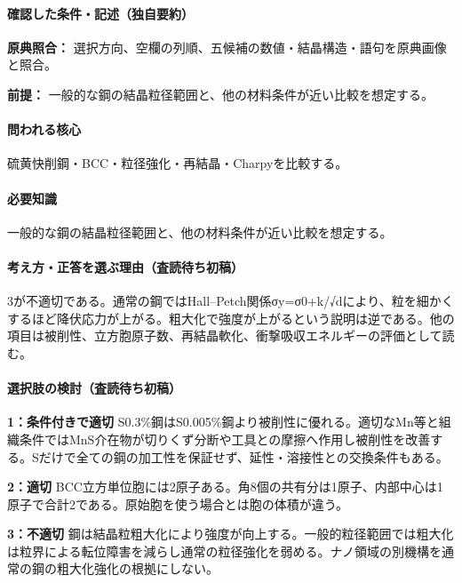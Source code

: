 \paragraph{確認した条件・記述（独自要約）}\mbox{}\par

\noindent\textbf{原典照合：} 選択方向、空欄の列順、五候補の数値・結晶構造・語句を原典画像と照合。\par

\noindent\textbf{前提：} 一般的な鋼の結晶粒径範囲と、他の材料条件が近い比較を想定する。\par

\paragraph{問われる核心} 硫黄快削鋼・BCC・粒径強化・再結晶・Charpyを比較する。

\paragraph{必要知識} 一般的な鋼の結晶粒径範囲と、他の材料条件が近い比較を想定する。

\paragraph{考え方・正答を選ぶ理由（査読待ち初稿）} 3が不適切である。通常の鋼ではHall–Petch関係σy=σ0+k/√dにより、粒を細かくするほど降伏応力が上がる。粗大化で強度が上がるという説明は逆である。他の項目は被削性、立方胞原子数、再結晶軟化、衝撃吸収エネルギーの評価として読む。

\paragraph{選択肢の検討（査読待ち初稿）}\mbox{}\par

\noindent\textbf{1：条件付きで適切} S0.3\%鋼はS0.005\%鋼より被削性に優れる。適切なMn等と組織条件ではMnS介在物が切りくず分断や工具との摩擦へ作用し被削性を改善する。Sだけで全ての鋼の加工性を保証せず、延性・溶接性との交換条件もある。\par

\noindent\textbf{2：適切} BCC立方単位胞には2原子ある。角8個の共有分は1原子、内部中心は1原子で合計2である。原始胞を使う場合とは胞の体積が違う。\par

\noindent\textbf{3：不適切} 鋼は結晶粒粗大化により強度が向上する。一般的粒径範囲では粗大化は粒界による転位障害を減らし通常の粒径強化を弱める。ナノ領域の別機構を通常の鋼の粗大化強化の根拠にしない。\par

